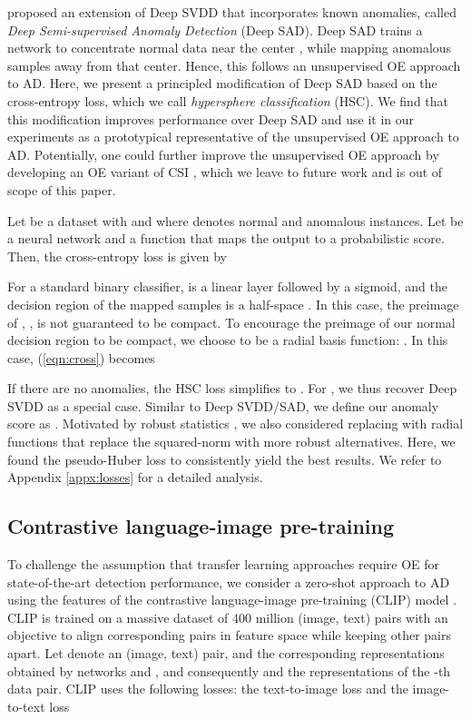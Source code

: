 \documentclass[10pt]{article} \usepackage[accepted]{stylefiles/tmlr}
\begin{document}
\citet{ruff2020} proposed an extension of Deep SVDD that incorporates known anomalies, called \emph{Deep Semi-supervised Anomaly Detection} (Deep SAD). 
Deep SAD trains a network to concentrate normal data near the center , while mapping anomalous samples away from that center. 
Hence, this follows an unsupervised OE approach to AD. 
Here, we present a principled modification of Deep SAD based on the cross-entropy loss, which we call \emph{hypersphere classification} (HSC). 
We find that this modification improves performance over Deep SAD and use it in our experiments as a prototypical representative of the unsupervised OE approach to AD.
Potentially, one could further improve the unsupervised OE approach by developing an OE variant of CSI \citep{tack2020}, which we leave to future work and is out of scope of this paper.


Let  be a dataset with  and  where  denotes normal and  anomalous instances. Let  be a neural network and  a function that maps the output to a probabilistic score. 
Then, the cross-entropy loss is given by

For a standard binary classifier,  is a linear layer followed by a sigmoid, and the decision region of the mapped samples  is a half-space . 
In this case, the preimage of , , is not guaranteed to be compact. 
To encourage the preimage of our normal decision region to be compact, we choose  to be a radial basis function: .
In this case, (\ref{eqn:cross}) becomes

If there are no anomalies, the HSC loss simplifies to . 
For , we thus recover Deep SVDD as a special case.
Similar to Deep SVDD/SAD, we define our anomaly score as .
Motivated by robust statistics \citep{hampel2005,huber2009}, we also considered replacing  with radial functions that replace the squared-norm with more robust alternatives. 
Here, we found the pseudo-Huber loss \citep{charbonnier1997deterministic} to consistently yield the best results. 
We refer to Appendix \ref{appx:losses} for a detailed analysis.


\subsection{Contrastive language-image pre-training} \label{sec:clip}
To challenge the assumption that transfer learning approaches require OE for state-of-the-art detection performance, we consider a zero-shot approach to AD using the features of the contrastive language-image pre-training (CLIP) model \citep{radford2021learning}.
CLIP is trained on a massive dataset of 400 million (image, text) pairs with an objective to align corresponding pairs in feature space while keeping other pairs apart. 
Let  denote an (image, text) pair,  and  the corresponding representations obtained by networks  and , and consequently  and  the representations of the -th data pair.
CLIP uses the following losses: the text-to-image loss  and the image-to-text loss 
\end{document}
